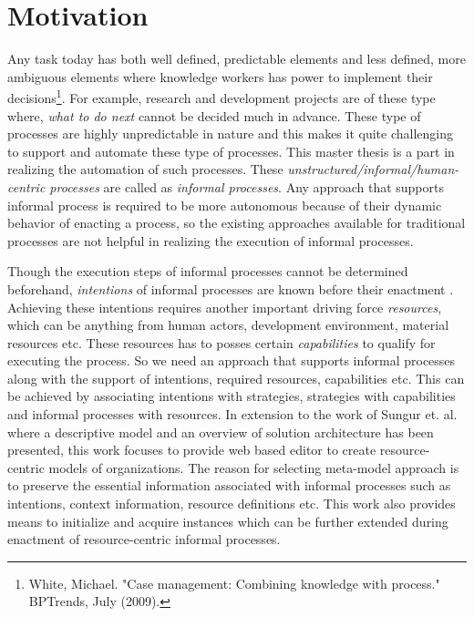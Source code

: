 \section{Motivation}
\label{sec:motivation}
Any task today has both well defined, predictable elements and less defined, more ambiguous elements where knowledge workers has power to implement their decisions\footnote{White, Michael. "Case management: Combining knowledge with process." BPTrends, July (2009).}. For example, research and development projects are of these type where, \textit{what to do next} cannot be decided much in advance. These type of processes are highly unpredictable in nature and this makes it quite challenging to support and automate these type of processes. This master thesis is a part in realizing the automation of such processes. These \textit{unstructured/informal/human-centric processes} are called as \textit{informal processes}\cite{Sungur2014}. Any approach that supports informal process is required to be more autonomous because of their dynamic behavior of enacting a process, so the existing approaches available for traditional processes are not helpful in realizing the execution of informal processes.  


Though the execution steps of informal processes cannot be determined beforehand, \textit{intentions} of informal processes are known before their enactment \cite{Sungur2015}. Achieving these intentions requires another important driving force \textit{resources}, which can be anything from human actors, development environment, material resources etc. These resources has to posses certain \textit{capabilities} to qualify for executing the process. So we need an approach that supports informal processes along with the support of intentions, required resources, capabilities etc. This can be achieved by associating intentions with strategies, strategies with capabilities and informal processes with resources. In extension to the work of Sungur et. al. \cite{Sungur2014a} where a descriptive model and an overview of solution architecture has been presented, this work  focuses to provide web based  editor to create resource-centric models of organizations. The reason for selecting meta-model approach is to preserve the essential information associated with informal processes such as intentions, context information, resource definitions etc.  This work also provides means to initialize and acquire instances which can be further extended during enactment of resource-centric informal processes.  


